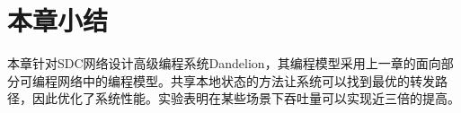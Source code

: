 \section{本章小结}

本章针对SDC网络设计高级编程系统Dandelion，其编程模型采用上一章的面向部分可编程网络中的编程模型。共享本地状态的方法让系统可以找到最优的转发路径，因此优化了系统性能。实验表明在某些场景下吞吐量可以实现近三倍的提高。


